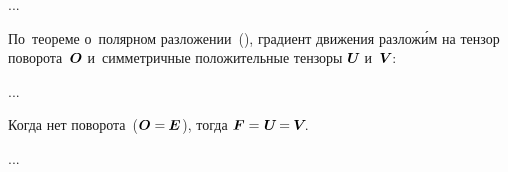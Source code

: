 ...

\begin{otherlanguage}{russian}

По~теореме о~полярном разложении~(), градиент движения разлож\'{и}м на тензор поворота~$\bm{O}$ и~симметричные положительные тензоры ${\bm{U}\hspace{-0.25ex}}$ и~${\bm{V}\hspace{-0.2ex}}$:

...

Когда нет поворота~(${\bm{O} = \hspace{-0.1ex} \bm{E} \hspace{0.1ex}}$), тогда ${\bm{F} = \hspace{0.1ex} \bm{U} \hspace{-0.25ex} = \hspace{-0.1ex} \bm{V}\hspace{-0.4ex}}$.

...



\end{otherlanguage}



\label{para:deformationtensors}

